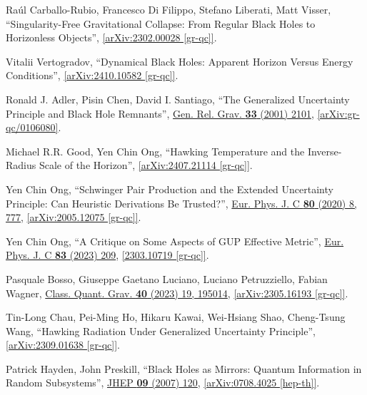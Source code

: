 \documentclass[12pt,preprintnumbers, floatfix, preprintnumbers, letterpaper, superscriptaddress,nofootinbib]{revtex4-2}
\begin{document}
\begin{thebibliography}{99}
Raúl Carballo-Rubio, Francesco Di Filippo, Stefano Liberati, Matt Visser, ``Singularity-Free Gravitational Collapse: From Regular Black Holes to Horizonless Objects'', \href{https://arxiv.org/abs/2302.00028}{[arXiv:2302.00028 [gr-qc]]}.

Vitalii Vertogradov, ``Dynamical Black Holes: Apparent Horizon Versus Energy Conditions'', \href{https://arxiv.org/abs/2410.10582}{[arXiv:2410.10582 [gr-qc]]}.

Ronald J. Adler, Pisin Chen, David I. Santiago, ``The Generalized Uncertainty Principle and Black Hole Remnants'', {\hypersetup{urlcolor=vividviolet}\href{https://link.springer.com/article/10.1023/A:1015281430411}{Gen. Rel. Grav. \textbf{33} (2001) 2101}}, \href{https://arxiv.org/abs/gr-qc/0106080}{[arXiv:gr-qc/0106080]}.

Michael R.R. Good, Yen Chin Ong, ``Hawking Temperature and the Inverse-Radius Scale of the Horizon'', \href{https://arxiv.org/abs/2407.21114}{[arXiv:2407.21114 [gr-qc]]}.

Yen Chin Ong, ``Schwinger Pair Production and the Extended Uncertainty Principle: Can Heuristic Derivations Be Trusted?'', {\hypersetup{urlcolor=vividviolet}\href{https://link.springer.com/article/10.1140/epjc/s10052-020-8363-2}{Eur. Phys. J. C \textbf{80} (2020) 8, 777}}, \href{https://arxiv.org/abs/2005.12075}{[arXiv:2005.12075 [gr-qc]]}.

Yen Chin Ong, ``A Critique on Some Aspects of GUP Effective Metric'', {\hypersetup{urlcolor=vividviolet}\href{https://link.springer.com/article/10.1140/epjc/s10052-023-11360-x}{Eur. Phys. J. C \textbf{83} (2023) 209}}, \href{https://arxiv.org/abs/2303.10719}{[2303.10719 [gr-qc]]}.

Pasquale Bosso, Giuseppe Gaetano Luciano, Luciano Petruzziello, Fabian Wagner, {\hypersetup{urlcolor=vividviolet}\href{https://iopscience.iop.org/article/10.1088/1361-6382/acf021}{Class. Quant. Grav. \textbf{40} (2023) 19, 195014}}, \href{https://arxiv.org/abs/2305.16193}{[arXiv:2305.16193 [gr-qc]]}.

Tin-Long Chau, Pei-Ming Ho, Hikaru Kawai, Wei-Hsiang Shao, Cheng-Tsung Wang, ``Hawking Radiation Under Generalized Uncertainty Principle'', \href{https://arxiv.org/abs/2309.01638}{[arXiv:2309.01638 [gr-qc]]}. 

Patrick Hayden, John Preskill, ``Black Holes as Mirrors: Quantum Information in Random Subsystems'', {\hypersetup{urlcolor=vividviolet}\href{https://iopscience.iop.org/article/10.1088/1126-6708/2007/09/120}{JHEP \textbf{09} (2007) 120}}, \href{https://arxiv.org/abs/0708.4025}{[arXiv:0708.4025 [hep-th]]}.


\end{thebibliography}
\end{document}
